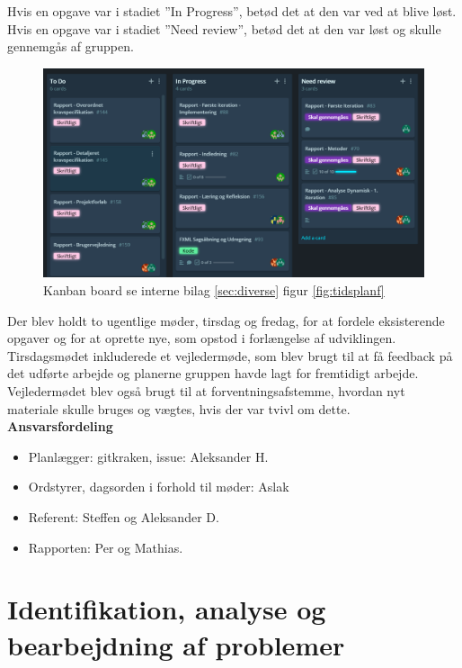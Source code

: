 Hvis en opgave var i stadiet ”In Progress”, betød det at den var ved at blive løst.\\
Hvis en opgave var i stadiet ”Need review”, betød det at den var løst og skulle gennemgås af gruppen.\\
\begin{figure}[h]
\includegraphics[width = \linewidth]{./PNG/proces/kanban.png}
\caption{Kanban board se interne bilag \ref{sec:diverse} figur \ref{fig:tidsplanf}}
\label{fig:kanban}
\end{figure}
Der blev holdt to ugentlige møder, tirsdag og fredag, for at fordele eksisterende opgaver og for at oprette nye, som opstod i forlængelse af udviklingen. Tirsdagsmødet inkluderede et vejledermøde, som blev brugt til at få feedback på det udførte arbejde og planerne gruppen havde lagt for fremtidigt arbejde. Vejledermødet blev også brugt til at forventningsafstemme, hvordan nyt materiale skulle bruges og vægtes, hvis der var tvivl om dette.\\
\textbf{Ansvarsfordeling}
\begin{itemize}
\item Planlægger: gitkraken, issue: Aleksander H. 
\item Ordstyrer, dagsorden i forhold til møder: Aslak 
\item Referent: Steffen og Aleksander D. 
\item Rapporten: Per og Mathias. 
\end{itemize}
\section{Identifikation, analyse og bearbejdning af problemer}
